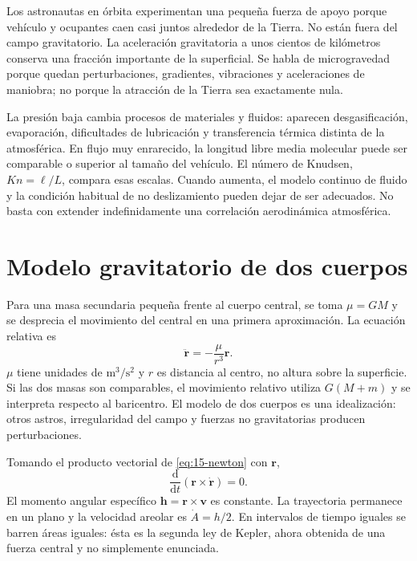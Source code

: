 Los astronautas en órbita experimentan una pequeña fuerza de apoyo porque vehículo y ocupantes caen casi juntos alrededor de la Tierra. No están fuera del campo gravitatorio. La aceleración gravitatoria a unos cientos de kilómetros conserva una fracción importante de la superficial. Se habla de microgravedad porque quedan perturbaciones, gradientes, vibraciones y aceleraciones de maniobra; no porque la atracción de la Tierra sea exactamente nula.

La presión baja cambia procesos de materiales y fluidos: aparecen desgasificación, evaporación, dificultades de lubricación y transferencia térmica distinta de la atmosférica. En flujo muy enrarecido, la longitud libre media molecular puede ser comparable o superior al tamaño del vehículo. El número de Knudsen, $Kn=\ell/L$, compara esas escalas. Cuando aumenta, el modelo continuo de fluido y la condición habitual de no deslizamiento pueden dejar de ser adecuados. No basta con extender indefinidamente una correlación aerodinámica atmosférica.

\section{Modelo gravitatorio de dos cuerpos}
Para una masa secundaria pequeña frente al cuerpo central, se toma $\mu=GM$ y se desprecia el movimiento del central en una primera aproximación. La ecuación relativa es
\begin{equation}\label{eq:15-newton}
\ddot{\boldsymbol r}=-\frac{\mu}{r^3}\boldsymbol r.
\end{equation}
$\mu$ tiene unidades de $\mathrm{m^3/s^2}$ y $r$ es distancia al centro, no altura sobre la superficie. Si las dos masas son comparables, el movimiento relativo utiliza $G(M+m)$ y se interpreta respecto al baricentro. El modelo de dos cuerpos es una idealización: otros astros, irregularidad del campo y fuerzas no gravitatorias producen perturbaciones.

Tomando el producto vectorial de \eqref{eq:15-newton} con $\boldsymbol r$,
\begin{equation}
\frac{\mathrm d}{\mathrm dt}(\boldsymbol r\times\dot{\boldsymbol r})=0.
\end{equation}
El momento angular específico $\boldsymbol h=\boldsymbol r\times\boldsymbol v$ es constante. La trayectoria permanece en un plano y la velocidad areolar es $\dot A=h/2$. En intervalos de tiempo iguales se barren áreas iguales: ésta es la segunda ley de Kepler, ahora obtenida de una fuerza central y no simplemente enunciada.

